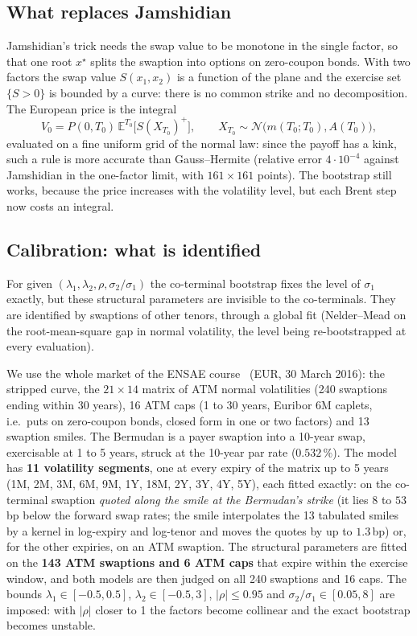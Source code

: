 \documentclass[11pt,a4paper]{article}
\theoremstyle{definition}
\theoremstyle{remark}
\newcommand{\E}{\mathbb{E}}
\newcommand{\N}{\mathcal{N}}
\begin{document}
\subsection{What replaces Jamshidian}
Jamshidian's trick needs the swap value to be monotone in the single factor, so that one root $x^\star$ splits the swaption into options
on zero-coupon bonds. With two factors the swap value $S(x_1,x_2)$ is a function of the plane and the exercise set $\{S>0\}$ is bounded by a
curve: there is no common strike and no decomposition. The European price is the integral
\[
V_0=P(0,T_0)\,\E^{T_0}\!\big[S(X_{T_0})^+\big],\qquad X_{T_0}\sim\N\big(m(T_0;T_0),A(T_0)\big),
\]
evaluated on a fine uniform grid of the normal law: since the payoff has a kink, such a rule is more accurate than Gauss--Hermite
(relative error $4\cdot10^{-4}$ against Jamshidian in the one-factor limit, with $161\times161$ points). The bootstrap still works, because the
price increases with the volatility level, but each Brent step now costs an integral.

\subsection{Calibration: what is identified}
For given $(\lambda_1,\lambda_2,\rho,\sigma_2/\sigma_1)$ the co-terminal bootstrap fixes the level of $\sigma_1$ exactly, but these structural
parameters are invisible to the co-terminals. They are identified by swaptions of other tenors, through a global fit (Nelder--Mead on the
root-mean-square gap in normal volatility, the level being re-bootstrapped at every evaluation).

We use the whole market of the ENSAE course~\cite{ensae} (EUR, 30 March 2016): the stripped curve, the $21\times14$ matrix of ATM normal volatilities
(240 swaptions ending within 30 years), 16 ATM caps (1 to 30 years, Euribor 6M caplets, i.e.\ puts on zero-coupon bonds, closed form in one or two factors)
and 13 swaption smiles. The Bermudan is a payer swaption into a 10-year swap, exercisable at 1 to 5 years, struck at the 10-year par rate
($0.532\,\%$). The model has \textbf{11 volatility segments}, one at every expiry of the matrix up to 5 years (1M, 2M, 3M, 6M, 9M, 1Y, 18M, 2Y, 3Y, 4Y, 5Y),
each fitted exactly: on the co-terminal swaption \emph{quoted along the smile at the Bermudan's strike} (it lies $8$ to $53\,$bp below the forward swap
rates; the smile interpolates the 13 tabulated smiles by a kernel in log-expiry and log-tenor and moves the quotes by up to $1.3\,$bp) or, for
the other expiries, on an ATM swaption. The structural parameters are fitted on the \textbf{143 ATM swaptions and 6 ATM caps} that expire within the
exercise window, and both models are then judged on all 240 swaptions and 16 caps. The bounds $\lambda_1\in[-0.5,0.5]$, $\lambda_2\in[-0.5,3]$,
$|\rho|\le0.95$ and $\sigma_2/\sigma_1\in[0.05,8]$ are imposed: with $|\rho|$ closer to 1 the factors become collinear and the exact bootstrap becomes unstable.
\end{document}
